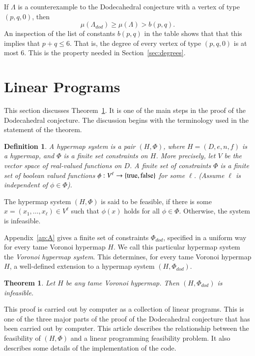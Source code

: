 \documentclass{article} %
\newtheorem{theorem}{Theorem}[section]
\newtheorem{definition}[lemma]{Definition}
\begin{document}
If $\Lambda$ is a counterexample to the Dodecahedral conjecture with a vertex
of type $(p,q,0)$, then
$$\mu(\Lambda_{dod}) \ge \mu(\Lambda) > b(p,q).$$
An inspection of the list of constants $b(p,q)$ in the table shows that that this implies
that $p+q\le 6$.  That is, the degree of every vertex of type $(p,q,0)$
is at most $6$.  This
is the property needed in Section~\ref{sec:degrees}.

\section{Linear Programs}

This section discusses Theorem~\ref{thm:graph-system}.  It is one of
the main steps in the proof of the Dodecahedral conjecture.
The discussion begins with the terminology used in the
statement of the theorem.


\begin{definition} A hypermap system is a pair $(H,\Phi)$,
where $H=(D,e,n,f)$ is a hypermap, and $\Phi$ is a finite set constraints on $H$.  More precisely, let $V$ be the vector space of
real-valued functions on $D$.  A finite set of constraints $\Phi$ is a finite
set of boolean valued functions $\phi:V^\ell\to \{{\operatorname{true}},{\operatorname{false}}\}$
for some $\ell$. (Assume $\ell$ is independent of $\phi\in \Phi$).
\end{definition}

The hypermap system $(H,\Phi)$ is said to be feasible, if
there is some $x=(x_1,\ldots,x_\ell)\in V^\ell$ such that
$\phi(x)$ holds for all $\phi\in\Phi$. Otherwise,  
the system is infeasible.

Appendix~\ref{ap:A} gives a finite set of constraints $\Phi_{dod}$, 
specified
in a uniform way for every tame Voronoi hypermap $H$.  
We call this particular hypermap system
the {\it Voronoi hypermap system}. 
This determines,
for every tame Voronoi hypermap $H$, a well-defined extension
to a hypermap system $(H,\Phi_{dod})$.   


\begin{theorem}\label{thm:graph-system}  Let 
$H$ be any tame Voronoi hypermap. 
Then $(H,\Phi_{dod})$ is infeasible.
\end{theorem}

This proof is carried out by computer as a collection of linear
programs.  This is one of the three major parts of the proof
of the Dodecahedral conjecture that has been carried out by computer.
This article describes the relationship between the
feasibility of $(H,\Phi)$ and a linear programming feasibility
problem.  It also describes some details of the implementation of 
the code.
\end{document}
